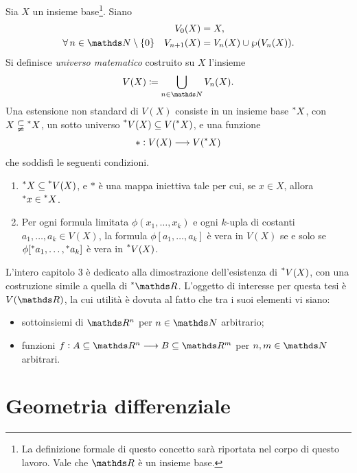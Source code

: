Sia $ X $ un insieme base\footnote{La definizione formale di questo concetto sarà riportata nel corpo di questo lavoro. Vale che $ \R $ è un insieme base.}. Siano \begin{align*}
    V_0(X) &= X, \\\forall\, n \in \N\setminus\{0\}\quad V_{n+1}(X) &= V_{n}(X)\cup\parti{V_{n}(X) }.
\end{align*}Si definisce \emph{universo matematico} costruito su $ X $ l'insieme \begin{equation*}
    V(X)\coloneqq \bigcup_{n \in \N} V_{n}(X). 
\end{equation*}
Una estensione non standard di $ V(X) $ consiste in un insieme base $ \prescript{*}{}{X} $, con $ X \subsetneqq \prescript{*}{}{X} $, un sotto universo $ \prescript{*}{}{V(X)} \subseteq V(\prescript{*}{}{X}) $, e una funzione \begin{equation*}
    *: V(X) \longrightarrow V(\prescript{*}{}{X})
\end{equation*}che soddisfi le seguenti condizioni. \begin{enumerate}
    \item[(I)] $ \prescript{*}{}{X} \subseteq \prescript{*}{}{V(X)} $, e $ * $ è una mappa iniettiva tale per cui, se $ x \in X $, allora $ \prescript{*}{}{x} \in \prescript{*}{}{X} $. 
    \item[(II)] Per ogni formula limitata $ \phi(x_1,\dots,x_{k} ) $ e ogni $ k $-upla di costanti $ a_1,\dots,a_{k} \in V(X)  $, la formula $ \phi[a_1,\dots,a_{k} ] $ è vera in $ V(X) $ se e solo se $ \phi[\prescript{*}{}{a_1},\dots,\prescript{*}{}{a_{k} }] $ è vera in $ \prescript{*}{}{V(X)} $.
\end{enumerate}

L'intero capitolo 3 è dedicato alla dimostrazione dell'esistenza di $ \prescript{*}{}{V(X)} $, con una costruzione simile a quella di $ \starR $.  L'oggetto di interesse per questa tesi è $ V(\R) $, la cui utilità è dovuta al fatto che tra i suoi elementi vi siano: \begin{itemize}
    \item sottoinsiemi di $ \R^{n} $ per $ n \in \N $ arbitrario;
    \item funzioni $ f: A \subseteq \R^{n} \longrightarrow B \subseteq \R^{m} $ per $ n,m \in \N $ arbitrari.
\end{itemize}

\section*{Geometria differenziale}


